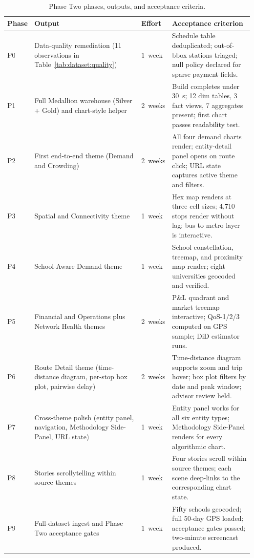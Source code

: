 \begin{table}[!htbp]
\centering
\caption{Phase Two phases, outputs, and acceptance criteria.}
\label{tab:appB:phases}
\footnotesize
\renewcommand{\arraystretch}{1.25}
\begin{tabularx}{\linewidth}{p{0.7cm} p{4.6cm} p{1.5cm} X}
\hline
\textbf{Phase} & \textbf{Output} & \textbf{Effort} & \textbf{Acceptance criterion} \\
\hline
P0 & Data-quality remediation (11 observations in Table~\ref{tab:dataset:quality})
   & 1~week
   & Schedule table deduplicated; out-of-bbox stations triaged; null policy declared for sparse payment fields. \\
P1 & Full Medallion warehouse (Silver + Gold) and chart-style helper
   & 2~weeks
   & Build completes under 30~s; 12 dim tables, 3 fact views, 7 aggregates present; first chart passes readability test. \\
P2 & First end-to-end theme (Demand and Crowding)
   & 2~weeks
   & All four demand charts render; entity-detail panel opens on route click; URL state captures active theme and filters. \\
P3 & Spatial and Connectivity theme
   & 1~week
   & Hex map renders at three cell sizes; 4{,}710 stops render without lag; bus-to-metro layer is interactive. \\
P4 & School-Aware Demand theme
   & 1~week
   & School constellation, treemap, and proximity map render; eight universities geocoded and verified. \\
P5 & Financial and Operations plus Network Health themes
   & 2~weeks
   & P\&L quadrant and market treemap interactive; QoS-1/2/3 computed on GPS sample; DiD estimator runs. \\
P6 & Route Detail theme (time-distance diagram, per-stop box plot, pairwise delay)
   & 2~weeks
   & Time-distance diagram supports zoom and trip hover; box plot filters by date and peak window; advisor review held. \\
P7 & Cross-theme polish (entity panel, navigation, Methodology Side-Panel, URL state)
   & 1~week
   & Entity panel works for all six entity types; Methodology Side-Panel renders for every algorithmic chart. \\
P8 & Stories scrollytelling within source themes
   & 1~week
   & Four stories scroll within source themes; each scene deep-links to the corresponding chart state. \\
P9 & Full-dataset ingest and Phase Two acceptance gates
   & 1~week
   & Fifty schools geocoded; full 50-day GPS loaded; acceptance gates passed; two-minute screencast produced. \\
\hline
\end{tabularx}
\end{table}

